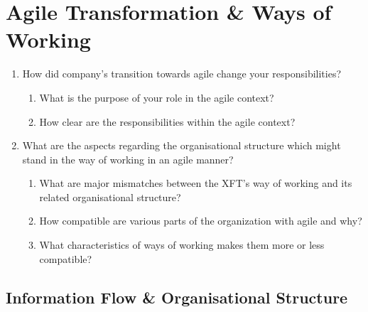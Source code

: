 \section*{Agile Transformation \& Ways of Working}

\begin{enumerate}
  \item How did company’s transition towards agile change your responsibilities?
  
  \begin{enumerate}
     \item What is the purpose of your role in the agile context?
     \item How clear are the responsibilities within the agile context?
  \end{enumerate}
  
  \item What are the aspects regarding the organisational structure which might stand in the way of working in an agile manner?
  
  \begin{enumerate}
    \item What are major mismatches between the XFT’s way of working and its related organisational structure?
    \item How compatible are various parts of the organization with agile and why?
    \item What characteristics of ways of working makes them more or less compatible?
  \end{enumerate}
\end{enumerate}

\subsection*{Information Flow \& Organisational Structure}

